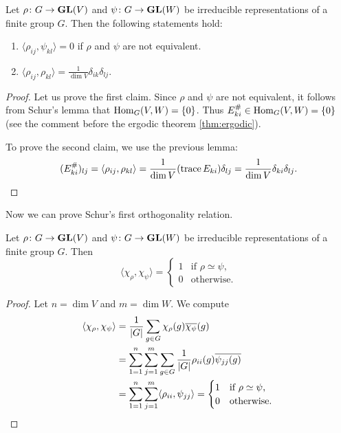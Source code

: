 \begin{theorem}[Schur]
\label{thm:Schur_technical}
    Let $\rho\colon G\to\mathbf{GL}(V)$ and $\psi\colon G\to\mathbf{GL}(W)$ be irreducible representations of a finite group $G$. 
    Then the following statements hold:
    \begin{enumerate}
        \item $\langle\rho_{ij},\psi_{kl}\rangle=0$ if $\rho$ and $\psi$ are not equivalent.
        \item $\displaystyle{\langle\rho_{ij},\rho_{kl}\rangle=\frac{1}{\dim V}\delta_{ik}\delta_{lj}}$.
    \end{enumerate}
\end{theorem}

\begin{proof}
    Let us prove the first claim. Since 
    $\rho$ and $\psi$ 
    are not equivalent, it follows from Schur's lemma that $\operatorname{Hom}_G(V,W)=\{0\}$.
    Thus $E_{ki}^\#\in\operatorname{Hom}_G(V,W)=\{0\}$ (see the comment 
    before the ergodic theorem \ref{thm:ergodic}). 
    
    To prove the second claim, we use the previous lemma:
    \[
    (E_{ki}^\#)_{lj}=\langle\rho_{ij},\rho_{kl}\rangle
    =\frac{1}{\dim V}(\operatorname{trace} E_{ki})\delta_{lj}
    =\frac{1}{\dim V}\delta_{ki}\delta_{lj}.\qedhere
    \]
\end{proof}

Now we can prove Schur's first orthogonality relation.

\begin{theorem}[Schur]
\label{thm:Schur}
Let $\rho\colon G\to\mathbf{GL}(V)$ and $\psi\colon G\to\mathbf{GL}(W)$ be irreducible representations of a finite group $G$. Then
\[
\langle\chi_\rho,\chi_\psi\rangle=
\begin{cases}
1 & \text{if $\rho\simeq\psi$,}\\
0 & \text{otherwise.}
\end{cases}
\]
\end{theorem}

\begin{proof}
    Let $n=\dim V$ and $m=\dim W$. We compute
    \begin{align*}
        \langle\chi_\rho,\chi_\psi\rangle
        &=\frac{1}{|G|}\sum_{g\in G}\chi_\rho(g)\overline{\chi_\psi}(g)\\
        &=\sum_{1=1}^n\sum_{j=1}^m\sum_{g\in G}\frac{1}{|G|}\rho_{ii}(g)\overline{\psi_{jj}(g)}\\
        &=\sum_{1=1}^n\sum_{j=1}^m\langle \rho_{ii},\psi_{jj}\rangle
        =\begin{cases}
            1 & \text{if $\rho\simeq\psi$,}\\
            0 & \text{otherwise.}
        \end{cases}\qedhere
    \end{align*}
\end{proof}


